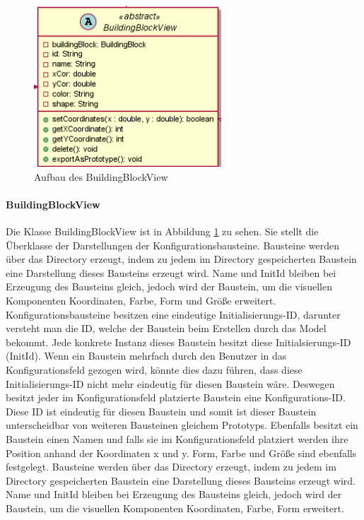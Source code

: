 \documentclass[parskip=full]{scrartcl}
\begin{document}
\newpage

\begin{figure}[htbp]
	\begin{center}
		\includegraphics[width = 7cm]{Grafiken/View/BuildingBlockView.PNG}
		\caption{Aufbau des BuildingBlockView}
		\label{BuildingBlockView}
	\end{center}
\end{figure}

\paragraph{BuildingBlockView}


Die Klasse BuildingBlockView ist in Abbildung \ref{BuildingBlockView} zu sehen. Sie stellt die Überklasse der Darstellungen der Konfigurationsbausteine.
Bausteine werden über das Directory erzeugt, indem zu jedem im Directory gespeicherten Baustein eine Darstellung dieses Bausteins erzeugt wird. Name und InitId bleiben bei Erzeugung des Bausteins gleich, jedoch wird der Baustein, um die visuellen Komponenten Koordinaten, Farbe, Form und Größe erweitert.
Konfigurationsbausteine besitzen eine eindeutige Initialisierungs-ID, darunter versteht man die ID, welche der Baustein beim Erstellen durch das Model bekommt. Jede konkrete Instanz dieses Baustein besitzt diese Initialsierungs-ID (InitId). Wenn ein Baustein mehrfach durch den Benutzer in das Konfigurationsfeld gezogen wird, könnte dies dazu führen, dass diese Initialisierungs-ID nicht mehr eindeutig für diesen Baustein wäre. Deswegen besitzt jeder im Konfigurationsfeld platzierte Baustein eine Konfigurations-ID. Diese ID ist eindeutig für diesen Baustein und somit ist dieser Baustein unterscheidbar von weiteren Bausteinen gleichem Prototyps. Ebenfalls besitzt ein Baustein einen Namen und falls sie im Konfigurationsfeld platziert werden ihre Position anhand der Koordinaten x und y. Form, Farbe und Größe sind ebenfalls festgelegt.  
Bausteine werden über das Directory erzeugt, indem zu jedem im Directory gespeicherten Baustein eine Darstellung dieses Bausteins erzeugt wird. Name und InitId bleiben bei Erzeugung des Bausteins gleich, jedoch wird der Baustein, um die visuellen Komponenten Koordinaten, Farbe, Form erweitert.
\end{document}
